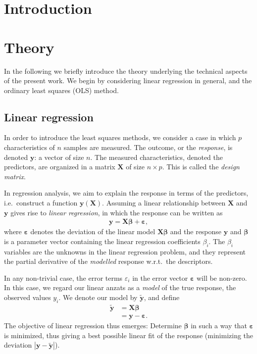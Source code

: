 \documentclass[a4paper]{article}
\begin{document}
\begin{multicols}{2}
\section{Introduction}
\lipsum[3]

\section{Theory}
In the following we briefly introduce the theory underlying the technical aspects of the present work. We begin by considering linear regression in general, and the ordinary least squares (OLS) method.

\subsection{Linear regression}
In order to introduce the least squares methods, we consider a case in which $p$ characteristics of $n$ samples are measured. The outcome, or the \textit{response}, is denoted $\mathbf{y}$: a vector of size $n$. The measured characteristics, denoted the predictors, are organized in a matrix $\mathbf{X}$ of size $n\times p$. This is called the \textit{design matrix}.

In regression analysis, we aim to explain the response in terms of the predictors, i.e.\ construct a function $\mathbf{y}(\mathbf{X})$. Assuming a linear relationship between $\mathbf{X}$ and $\mathbf{y}$ gives rise to \textit{linear regression}, in which the response can be written as 
\begin{align}
\mathbf{y}=\mathbf{X}\bm{\beta}+\bm{\varepsilon},
\end{align}
where $\bm{\varepsilon}$ denotes the deviation of the linear model $\mathbf{X}\bm{\beta}$ and the response $\mathbf{y}$ and $\bm{\beta}$ is a parameter vector containing the linear regression coefficients $\beta_i$. The $\beta_i$ variables are the unknowns in the linear regression problem, and they represent the partial derivative of the \textit{modelled} response w.r.t.\ the descriptors. 

In any non-trivial case, the error terms $\varepsilon_i$ in the error vector $\bm\varepsilon$ will be non-zero. In this case, we regard our linear anzats as a \textit{model} of the true response, the observed values $y_i$. We denote our model by $\tilde{\mathbf{y}}$, and define 
\begin{align}
\tilde{\mathbf{y}} &= \mathbf{X}\bm{\beta} \\
&= \mathbf{y}-\bm{\varepsilon}. \nonumber
\end{align}
The objective of linear regression thus emerges: Determine $\bm\beta$ in such a way that $\bm\varepsilon$ is minimized, thus giving a best possible linear fit of the response (minimizing the deviation $|\mathbf{y}-\tilde{\mathbf{y}}|$).


\end{multicols}
\end{document}
